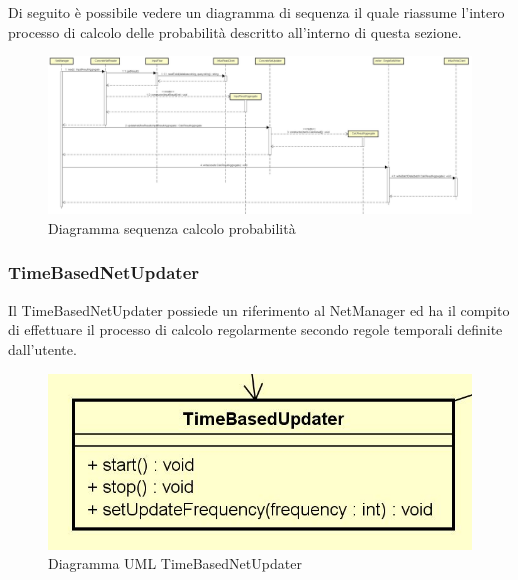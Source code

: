 Di seguito è possibile vedere un diagramma di sequenza il quale riassume l'intero processo di calcolo delle probabilità descritto all'interno di questa sezione.
\begin{figure} [H]
	\centering
			\includegraphics[scale=0.17]{Img/ProcessoRicalcolo}
	\caption{Diagramma sequenza calcolo probabilità}\label{}
\end{figure}
\subsubsection{TimeBasedNetUpdater}
Il TimeBasedNetUpdater possiede un riferimento al NetManager ed ha il compito di effettuare il processo di calcolo regolarmente secondo regole temporali definite dall'utente.
\begin{figure} [H]
	\centering
		\includegraphics[scale=0.8]{Img/TimeBasedUpdater}
	\caption{Diagramma UML TimeBasedNetUpdater}\label{}
\end{figure}

